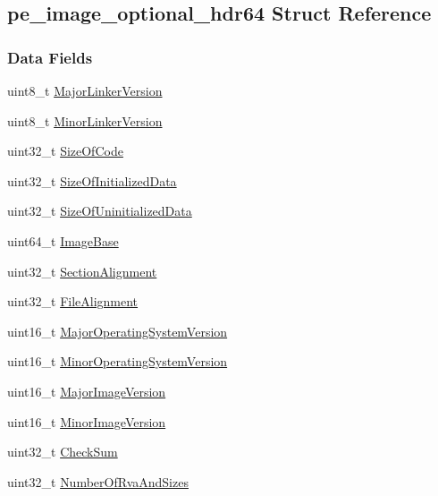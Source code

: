 \hypertarget{structpe__image__optional__hdr64}{
\subsection{pe\_\-image\_\-optional\_\-hdr64 Struct Reference}
\label{structpe__image__optional__hdr64}
}
\subsubsection*{Data Fields}
\begin{DoxyCompactItemize}
\item 
uint8\_\-t \hyperlink{structpe__image__optional__hdr64_a9fe20c528b23d8a85a250c33c761b840}{MajorLinkerVersion}
\item 
uint8\_\-t \hyperlink{structpe__image__optional__hdr64_a0cc5019694053488b343a458fbc0b657}{MinorLinkerVersion}
\item 
uint32\_\-t \hyperlink{structpe__image__optional__hdr64_abee9ed2d772fb9bec9f70e22d8f85c23}{SizeOfCode}
\item 
uint32\_\-t \hyperlink{structpe__image__optional__hdr64_a042c05a92b0c90acf2e1ee4672857153}{SizeOfInitializedData}
\item 
uint32\_\-t \hyperlink{structpe__image__optional__hdr64_aa82afa1757a8a7b76df97b35b4afea84}{SizeOfUninitializedData}
\item 
uint64\_\-t \hyperlink{structpe__image__optional__hdr64_af8df9953c8c190fdb02a4319088284c3}{ImageBase}
\item 
uint32\_\-t \hyperlink{structpe__image__optional__hdr64_ae19363fc9558f4fe8d710789d031f9ac}{SectionAlignment}
\item 
uint32\_\-t \hyperlink{structpe__image__optional__hdr64_a52c4f3c684bea4212e4fb8289794eb0d}{FileAlignment}
\item 
uint16\_\-t \hyperlink{structpe__image__optional__hdr64_a47b3939102eef106f0fc4d6a96c3ad14}{MajorOperatingSystemVersion}
\item 
uint16\_\-t \hyperlink{structpe__image__optional__hdr64_a8eb1d37329b3c54e63e8eb7832e30ba7}{MinorOperatingSystemVersion}
\item 
uint16\_\-t \hyperlink{structpe__image__optional__hdr64_a2902b4670e5eab8fcc2dc47c7fca868b}{MajorImageVersion}
\item 
uint16\_\-t \hyperlink{structpe__image__optional__hdr64_a7b61bcb8b63930c239079916325ae734}{MinorImageVersion}
\item 
uint32\_\-t \hyperlink{structpe__image__optional__hdr64_ab09f6da5ce2f33ac63606127b1bb2760}{CheckSum}
\item 
uint32\_\-t \hyperlink{structpe__image__optional__hdr64_a51e6fb2cbc64a53b2bb577f2dd2f677f}{NumberOfRvaAndSizes}
\end{DoxyCompactItemize}


